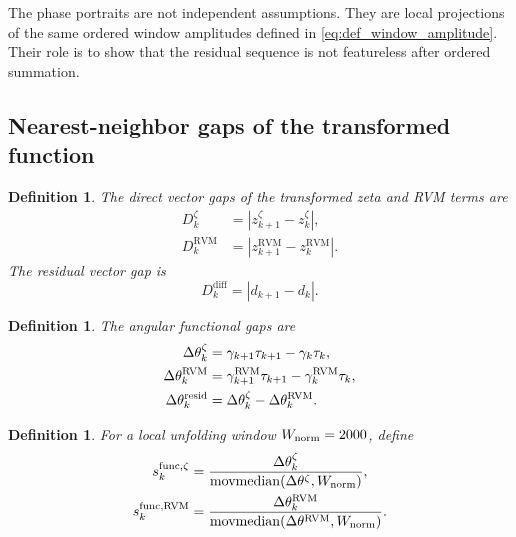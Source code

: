 \documentclass[12pt]{article}
\numberwithin{equation}{section}
\newtheorem{definition}[theorem]{Definition}
\newcommand{\RVM}{\mathrm{RVM}}
\newcommand{\diff}{\mathrm{diff}}
\begin{document}
\noindent The phase portraits are not independent assumptions.  They are local projections of the same ordered window amplitudes defined in \eqref{eq:def_window_amplitude}.  Their role is to show that the residual sequence is not featureless after ordered summation.


\subsection{Nearest-neighbor gaps of the transformed function}
\label{sec:nearest_neighbor_gaps}

\begin{definition}
\label{def:direct_vector_gaps}
The direct vector gaps of the transformed zeta and RVM terms are
\begin{align}
D_k^\zeta
&=
|z_{k+1}^\zeta-z_k^\zeta|,
\label{eq:def_zeta_vector_gap}
\\
D_k^{\RVM}
&=
|z_{k+1}^{\RVM}-z_k^{\RVM}|.
\label{eq:def_rvm_vector_gap}
\end{align}
The residual vector gap is
\begin{equation}
D_k^{\diff}
=
|d_{k+1}-d_k|.
\label{eq:def_diff_vector_gap}
\end{equation}
\end{definition}

\begin{definition}
\label{def:functional_angular_gaps}
The angular functional gaps are
\begin{align}
\Delta\theta_k^\zeta
&=
\gamma_{k+1}\tau_{k+1}-\gamma_k\tau_k,
\label{eq:def_zeta_functional_gap}
\\
\Delta\theta_k^{\RVM}
&=
\gamma_{k+1}^{\RVM}\tau_{k+1}-\gamma_k^{\RVM}\tau_k,
\label{eq:def_rvm_functional_gap}
\\
\Delta\theta_k^{\rm resid}
&=
\Delta\theta_k^\zeta-\Delta\theta_k^{\RVM}.
\label{eq:def_resid_functional_gap}
\end{align}
\end{definition}

\begin{definition}
\label{def:locally_unfolded_functional_gap}
For a local unfolding window \(W_{\rm norm}=2000\), define
\begin{align}
s_k^{\rm func,\zeta}
&=
\frac{\Delta\theta_k^\zeta}
{\operatorname{movmedian}(\Delta\theta^\zeta,W_{\rm norm})},
\label{eq:def_sfunc_zeta}
\\
s_k^{\rm func,\RVM}
&=
\frac{\Delta\theta_k^{\RVM}}
{\operatorname{movmedian}(\Delta\theta^{\RVM},W_{\rm norm})}.
\label{eq:def_sfunc_rvm}
\end{align}
\end{definition}
\end{document}
